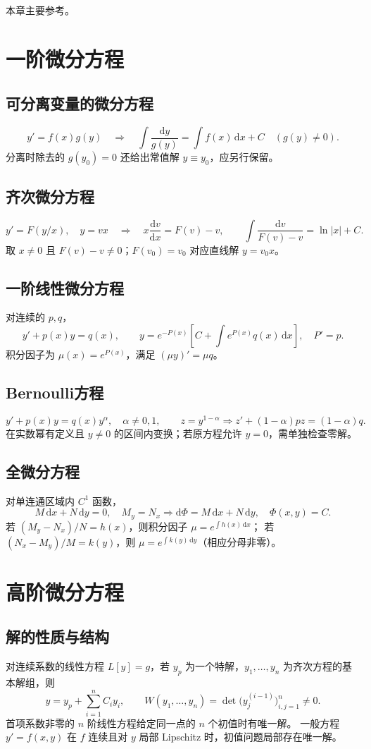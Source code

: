 \documentclass[../main.tex]{subfiles}
\begin{document}
本章主要参考\cite{teschl,dlmf}。

\section{一阶微分方程}
\subsection{可分离变量的微分方程}
\[
y'=f(x)g(y)\quad\Longrightarrow\quad
\int\frac{\mathrm dy}{g(y)}=\int f(x)\,\mathrm dx+C\quad(g(y)\ne0).
\]
分离时除去的 $g(y_0)=0$ 还给出常值解 $y\equiv y_0$，应另行保留。
\subsection{齐次微分方程}
\[
y'=F(y/x),\quad y=vx\quad\Longrightarrow\quad
x\frac{\mathrm dv}{\mathrm dx}=F(v)-v,\qquad
\int\frac{\mathrm dv}{F(v)-v}=\ln|x|+C.
\]
取 $x\ne0$ 且 $F(v)-v\ne0$；$F(v_0)=v_0$ 对应直线解 $y=v_0x$。
\subsection{一阶线性微分方程}
对连续的 $p,q$，
\[
y'+p(x)y=q(x),\qquad
y=e^{-P(x)}\left[C+\int e^{P(x)}q(x)\,\mathrm dx\right],\quad P'=p.
\]
积分因子为 $\mu(x)=e^{P(x)}$，满足 $(\mu y)'=\mu q$。
\subsection{Bernoulli方程}
\[
y'+p(x)y=q(x)y^\alpha,\quad\alpha\ne0,1,\qquad z=y^{1-\alpha}
\Longrightarrow z'+(1-\alpha)pz=(1-\alpha)q.
\]
在实数幂有定义且 $y\ne0$ 的区间内变换；若原方程允许 $y=0$，需单独检查零解。
\subsection{全微分方程}
对单连通区域内 $C^1$ 函数，
\[
M\,\mathrm dx+N\,\mathrm dy=0,\quad M_y=N_x
\Longrightarrow \mathrm d\Phi=M\,\mathrm dx+N\,\mathrm dy,\quad \Phi(x,y)=C.
\]
若 $(M_y-N_x)/N=h(x)$，则积分因子 $\mu=e^{\int h(x)\,\mathrm dx}$；
若 $(N_x-M_y)/M=k(y)$，则 $\mu=e^{\int k(y)\,\mathrm dy}$（相应分母非零）。
\section{高阶微分方程}
\subsection{解的性质与结构}
对连续系数的线性方程 $L[y]=g$，若 $y_p$ 为一个特解，$y_1,\ldots,y_n$ 为齐次方程的基本解组，则
\[
y=y_p+\sum_{i=1}^nC_iy_i,\qquad
W(y_1,\ldots,y_n)=\det\bigl(y_j^{(i-1)}\bigr)_{i,j=1}^n\ne0.
\]
首项系数非零的 $n$ 阶线性方程给定同一点的 $n$ 个初值时有唯一解。
一般方程 $y'=f(x,y)$ 在 $f$ 连续且对 $y$ 局部 Lipschitz 时，初值问题局部存在唯一解。
\end{document}
